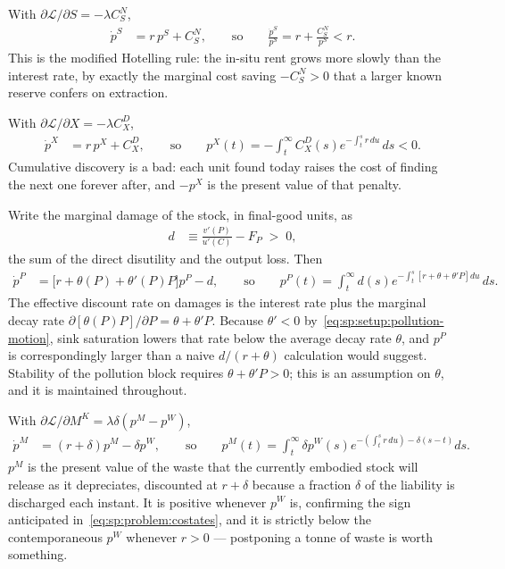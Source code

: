  With $\partial\mathcal L/\partial S=-\lambda C^N_S$,
\begin{align}
\dot p^S &= r\,p^S+C^N_S,
\qquad\text{so}\qquad
\frac{\dot p^S}{p^S} = r+\frac{C^N_S}{p^S}<r .
\label{eq:sp:costate:S}
\end{align}
This is the modified Hotelling rule: the in-situ rent grows more slowly than the interest rate,
by exactly the marginal cost saving $-C^N_S>0$ that a larger known reserve confers on extraction.

 With $\partial\mathcal L/\partial X=-\lambda C^D_X$,
\begin{align}
\dot p^X &= r\,p^X+C^D_X,
\qquad\text{so}\qquad
p^X\left(t\right) = -\int_t^\infty C^D_X\!\left(s\right)e^{-\int_t^s r\,du}\,ds<0 .
\label{eq:sp:costate:X}
\end{align}
Cumulative discovery is a bad: each unit found today raises the cost of finding the next one
forever after, and $-p^X$ is the present value of that penalty.

 Write the marginal damage of the stock, in final-good units, as
\begin{align}
d &\equiv \frac{v'\!\left(P\right)}{u'\!\left(C\right)}-F_P\;>\;0,
\label{eq:sp:problem:damage}
\end{align}
the sum of the direct disutility and the output loss. Then
\begin{align}
\dot p^P &= \Big[r+\theta\!\left(P\right)+\theta'\!\left(P\right)P\Big]p^P-d,
\qquad\text{so}\qquad
p^P\left(t\right)=\int_t^\infty d\left(s\right)e^{-\int_t^s\left[r+\theta+\theta'P\right]du}\,ds .
\label{eq:sp:costate:P}
\end{align}
The effective discount rate on damages is the interest rate plus the marginal decay rate
$\partial\left[\theta(P)P\right]/\partial P=\theta+\theta'P$. Because $\theta'<0$
by~\eqref{eq:sp:setup:pollution-motion}, sink saturation lowers that rate below the average decay
rate $\theta$, and $p^P$ is correspondingly larger than a naive $d/\left(r+\theta\right)$ calculation
would suggest. Stability of the pollution block requires $\theta+\theta'P>0$; this is an assumption
on $\theta$, and it is maintained throughout.

 With
$\partial\mathcal L/\partial M^K=\lambda\delta\left(p^M-p^W\right)$,
\begin{align}
\dot p^M &= \left(r+\delta\right)p^M-\delta p^W,
\qquad\text{so}\qquad
p^M\left(t\right)=\int_t^\infty \delta p^W\!\left(s\right)e^{-\left(\int_t^s r\,du\right)-\delta\left(s-t\right)}ds .
\label{eq:sp:costate:M}
\end{align}
$p^M$ is the present value of the waste that the currently embodied stock will release as it
depreciates, discounted at $r+\delta$ because a fraction $\delta$ of the liability is discharged
each instant. It is positive whenever $p^W$ is, confirming the sign anticipated
in~\eqref{eq:sp:problem:costates}, and it is strictly below the contemporaneous $p^W$ whenever
$r>0$ --- postponing a tonne of waste is worth something.

